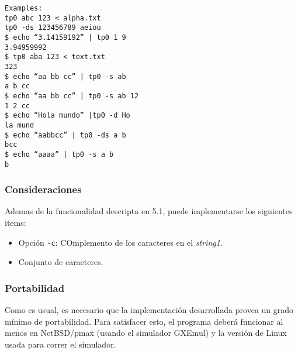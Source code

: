 \documentclass[a4paper,10pt]{article}
\begin{document}
\indent\texttt{Examples:}\\

\indent\texttt{tp0 abc 123 < alpha.txt}\\
\indent\texttt{tp0 -ds 123456789 aeiou}\\

\indent\texttt{\$ echo ``3.14159192'' | tp0 1 9}\\
\indent\texttt{3.94959992}\\

\indent\texttt{\$ tp0 aba 123 < text.txt}\\
\indent\texttt{323}\\

\indent\texttt{\$ echo ``aa bb cc'' | tp0 -s ab}\\
\indent\texttt{a b cc}\\

\indent\texttt{\$ echo ``aa bb cc'' | tp0 -s ab 12}\\
\indent\texttt{1 2 cc}\\

\indent\texttt{\$ echo ``Hola mundo'' |tp0 -d Ho}\\
\indent\texttt{la mund}\\

\indent\texttt{\$ echo ``aabbcc'' | tp0 -ds a b}\\
\indent\texttt{bcc}\\

\indent\texttt{\$ echo ``aaaa'' | tp0 -s a b}\\
\indent\texttt{b}\\

\newpage
\newpage

\subsubsection{Consideraciones}
Ademas de la funcionalidad descripta en 5.1, puede implementarse los siguientes items:

\begin{itemize}
\item Opci\'{o}n \indent\texttt{-c}: COmplemento de los caracteres en el \textit{string1}.
\item Conjunto de caracteres.
\end{itemize}

\subsubsection{Portabilidad}
Como es usual, es necesario que la implementaci\'{o}n desarrollada provea un grado m\'{i}nimo de portabilidad. Para satisfacer esto, el programa deber\'{a} funcionar al menos en  NetBSD/pmax (usando el simulador GXEmul) y la versi\'{o}n de Linux usada para correr el simulador.
\end{document}
